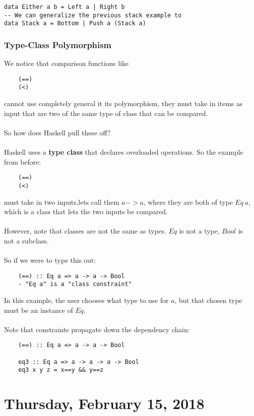 \documentclass[12pt]{article}
\begin{document}
\begin{lstlisting}
data Either a b = Left a | Right b
-- We can generalize the previous stack example to
data Stack a = Bottom | Push a (Stack a)
\end{lstlisting}

\subsubsection{Type-Class Polymorphism}

We notice that comparison functions like
\begin{lstlisting}
	(==)
	(<)
\end{lstlisting}
cannot use completely general it its polymorphism, they must take in items as input that are two of the same type of class that can be compared.\\
\\
So how does Haskell pull these off?\\
\\
Haskell uses a \textbf{type class} that declares overloaded operations. So the example from before:
\begin{lstlisting}
	(==)
	(<)
\end{lstlisting}
must take in two inputs,lets call them $a->a$, where they are both of type $Eq\: a$, which is a class that lets the two inputs be compared.\\
\\
However, note that classes are not the same as types. $Eq$ is not a type, $Bool$ is not a subclass.\\
\\
So if we were to type this out:
\begin{lstlisting}
	(==) :: Eq a => a -> a -> Bool
	- "Eq a" is a "class constraint"
\end{lstlisting}
In this example, the user chooses what type to use for $a$, but that chosen type must be an instance of $Eq$.\\
\\
Note that constraints propagate down the dependency chain:
\begin{lstlisting}
	(==) :: Eq a => a -> a -> Bool
	
	eq3 :: Eq a => a -> a -> a -> Bool
	eq3 x y z = x==y && y==z
\end{lstlisting}

\newpage

\section{Thursday, February 15, 2018}
\end{document}

